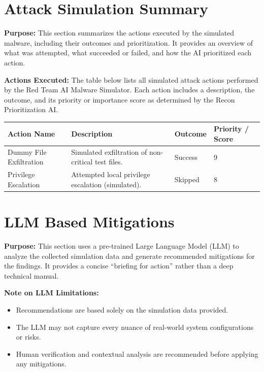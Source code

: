 \documentclass[a4paper,12pt]{article}
\begin{document}
\newpage


\section*{Attack Simulation Summary}

\textbf{Purpose:} This section summarizes the actions executed by the simulated malware, including their outcomes and prioritization. It provides an overview of what was attempted, what succeeded or failed, and how the AI prioritized each action.

\vspace{0.3cm}
\textbf{Actions Executed:} The table below lists all simulated attack actions performed by the Red Team AI Malware Simulator. Each action includes a description, the outcome, and its priority or importance score as determined by the Recon Prioritization AI.

\begin{longtable}{|p{4cm}|p{6cm}|p{2cm}|p{2cm}|}
\hline
\textbf{Action Name} & \textbf{Description} & \textbf{Outcome} & \textbf{Priority / Score} \\
\hline

    
Dummy File Exfiltration & Simulated exfiltration of non-critical test files. & Success & 9 \\
\hline
    
Privilege Escalation & Attempted local privilege escalation (simulated). & Skipped & 8 \\
\hline
    

\end{longtable}

\newpage


\section*{LLM Based Mitigations}

\textbf{Purpose:} This section uses a pre-trained Large Language Model (LLM) to analyze the collected simulation data and generate recommended mitigations for the findings. It provides a concise “briefing for action” rather than a deep technical manual.

\vspace{0.3cm}
\textbf{Note on LLM Limitations:}  
\begin{itemize}
    \item Recommendations are based solely on the simulation data provided.
    \item The LLM may not capture every nuance of real-world system configurations or risks.
    \item Human verification and contextual analysis are recommended before applying any mitigations.
\end{itemize}
\end{document}
